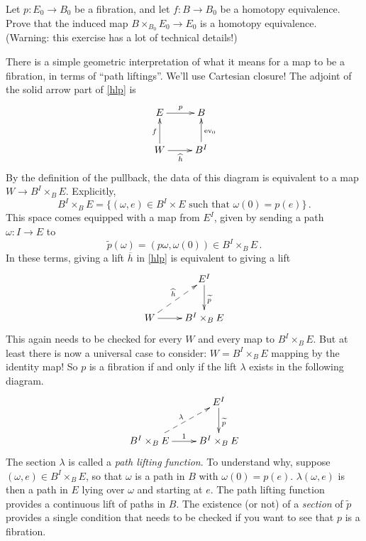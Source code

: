 \begin{exercise}
    Let $p:E_0 \to B_0$ be a fibration, and let $f:B \to B_0$ be a homotopy equivalence.
    Prove that the induced map $B\times_{B_0} E_0 \to E_0$ is a homotopy equivalence.
    (Warning: this exercise has a lot of technical details!) 
\end{exercise}


There is a simple geometric interpretation of what it means for a map to be a fibration, in terms of ``path liftings''. We'll use Cartesian closure! 
The adjoint of the solid arrow part of \eqref{hlp} is
\begin{equation}\label{hlp2}
    \xymatrix{
	E\ar[r]^p & B\\
	W\ar[u]^f\ar[r]_{\widehat{h}} & B^I\ar[u]_{\mathrm{ev}_0}
    }
\end{equation}
By the definition of the pullback, the data of this diagram is equivalent to a map $W\to B^I\times_B E$.
Explicitly,
\[
B^I\times_B E = \{(\omega, e) \in B^I\times E \text{ such that } \omega(0) = p(e)\}\,.
\]
This space comes equipped with a map from $E^I$, given by sending a path
$\omega:I\to E$ to 
\[
\widetilde{p}(\omega)=(p\omega,\omega(0))\in B^I\times_BE\,.
\]
In these terms, giving a lift $\overline{h}$ in \eqref{hlp} is equivalent to
giving a lift 
\begin{equation*}
    \xymatrix{
	& E^I\ar[d]^{\widetilde{p}}\\
	W\ar[r]\ar@{-->}[ur]^{\widehat{h}} & B^I\times_B E
    }
\end{equation*}
This again needs to be checked for every $W$ and every map to $B^I\times_BE$. 
But at least there is now a universal case to consider: $W=B^I\times_BE$ 
mapping by the identity map! 
So $p$ is a fibration if and only if the lift $\lambda$ 
exists in the following diagram.
\begin{equation*}
    \xymatrix{
	& E^I\ar[d]^{\widetilde{p}}\\
	B^I\times_B E\ar@{-->}[ur]^\lambda\ar[r]^1 & B^I\times_B E
    }
\end{equation*}
The section $\lambda$ is called a \emph{path lifting function}.
To understand why, suppose $(\omega, e) \in B^I\times_B E$, so that $\omega$
is a path in $B$ with $\omega(0)=p(e)$. 
$\lambda(\omega,e)$ is then a path in $E$ lying over $\omega$ and starting at
$e$. The path lifting function provides a continuous lift of paths in $B$. 
The existence (or not) of a {\em section} of $\widetilde{p}$ provides a single
condition that needs to be checked if you want to see that $p$ is a fibration. 

